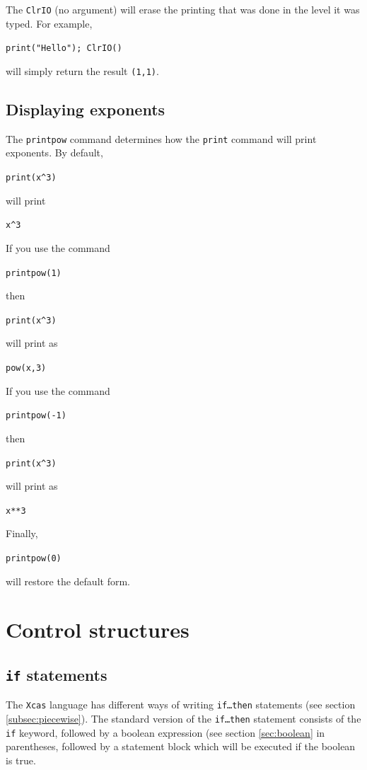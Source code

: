\documentclass[a4paper,11pt]{book}
\begin{document}
The \texttt{ClrIO} (no argument) will erase the printing
that was done in the level it was typed.  For example,
\begin{center}
{\tt print("Hello"); ClrIO()}
\end{center}
will simply return the result \texttt{(1,1)}.

\subsection{Displaying exponents}

The \texttt{printpow} command determines how the \texttt{print}
command will print exponents.  By default,
\begin{center}
{\tt print(x\^{}3)}
\end{center}
will print
\begin{center}
{\tt x\^{}3}
\end{center}
If you use the command
\begin{center}
{\tt printpow(1)}
\end{center}
then
\begin{center}
{\tt print(x\^{}3)}
\end{center}
will print as
\begin{center}
{\tt pow(x,3)}
\end{center}
If you use the command
\begin{center}
{\tt printpow(-1)}
\end{center}
then
\begin{center}
{\tt print(x\^{}3)}
\end{center}
will print as
\begin{center}
{\tt x**3}
\end{center}
Finally,
\begin{center}
{\tt printpow(0)}
\end{center}
will restore the default form.

\section{Control structures}

\subsection{\texttt{if} statements}

The \texttt{Xcas} language has different ways of writing
\texttt{if\ldots then} statements (see section \ref{subsec:piecewise}).  The
standard version of the \texttt{if\ldots then} statement consists of
the \texttt{if} keyword, followed by a boolean expression (see section
\ref{sec:boolean} in parentheses, followed by a statement block which
will be executed if the boolean is true.
\end{document}
